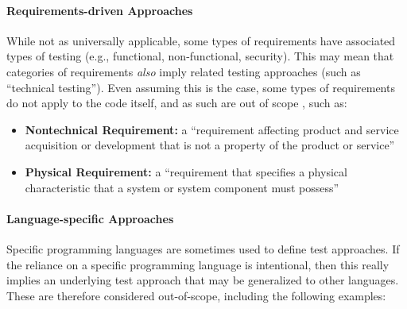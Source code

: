     \paragraph{Requirements-driven Approaches}
    \label{req-test}
    While not as universally applicable, some types of requirements have associated
    types of testing (e.g., functional, non-functional, security). This may mean
    that categories of requirements \emph{also} imply related testing approaches
    (such as ``technical testing''). \ifnotpaper Even assuming this is the case, some types of
        requirements do not apply to the code itself, and as such are out of scope%
        , such as:
        \begin{itemize}
            \item \textbf{Nontechnical Requirement:} a ``requirement affecting product
                  and service acquisition or development that is not a property of
                  the product or service'' \citep[p.~293]{IEEE2017}
            \item \textbf{Physical Requirement:} a ``requirement that specifies a
                  physical characteristic that a system or system component must
                  possess'' \citep[p.~322]{IEEE2017}
        \end{itemize}
    \fi

    \paragraph{Language-specific Approaches}
    \label{lang-test}
    Specific programming languages are sometimes used to define test approaches.
    If the reliance on a specific programming language is intentional, then
    this really implies an underlying test approach that may be generalized to
    other languages. These are therefore considered out-of-scope,
    including the following examples:

